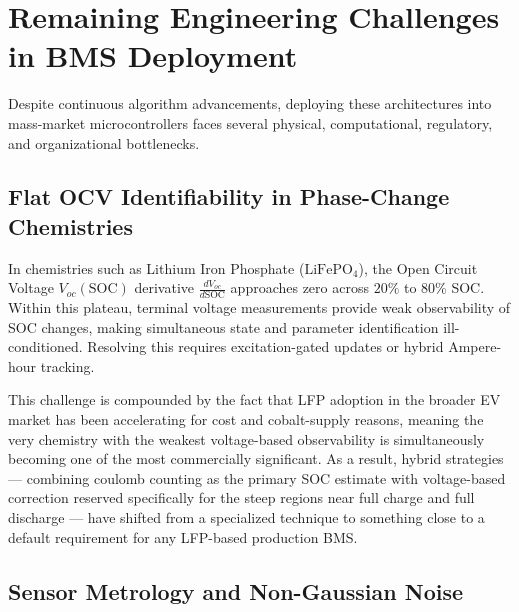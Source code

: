 
\section{Remaining Engineering Challenges in BMS Deployment}
\label{sec:14_remaining_challenges}

Despite continuous algorithm advancements, deploying these architectures into mass-market microcontrollers faces several physical, computational, regulatory, and organizational bottlenecks.

\subsection{Flat OCV Identifiability in Phase-Change Chemistries}
\label{subsec:14_flat_ocv}

In chemistries such as Lithium Iron Phosphate ($\text{LiFePO}_4$), the Open Circuit Voltage $V_{oc}(\text{SOC})$ derivative $\frac{d V_{oc}}{d \text{SOC}}$ approaches zero across $20\%$ to $80\%$ SOC. Within this plateau, terminal voltage measurements provide weak observability of SOC changes, making simultaneous state and parameter identification ill-conditioned. Resolving this requires excitation-gated updates or hybrid Ampere-hour tracking.

This challenge is compounded by the fact that LFP adoption in the broader EV market has been accelerating for cost and cobalt-supply reasons, meaning the very chemistry with the weakest voltage-based observability is simultaneously becoming one of the most commercially significant. As a result, hybrid strategies — combining coulomb counting as the primary SOC estimate with voltage-based correction reserved specifically for the steep regions near full charge and full discharge — have shifted from a specialized technique to something close to a default requirement for any LFP-based production BMS.

\subsection{Sensor Metrology and Non-Gaussian Noise}
\label{subsec:14_sensor_metrology}

